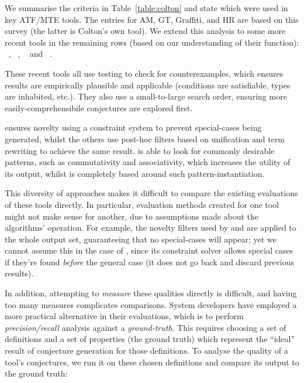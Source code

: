 

We summarise the criteria in Table~\ref{table:colton} and state which were used
in key ATF/MTE tools. The entries for AM, GT, Graffiti, \Bagai{} and HR are
based on this survey (the latter is Colton's own tool). We extend this analysis
to some more recent tools in the remaining rows (based on our understanding of
their function): \quickspec{}~\cite{QuickSpec},
\speculate{}~\cite{braquehais2017speculate},
\isacosy{}~\cite{Johansson.Dixon.Bundy:conjecture-generation}
and \isascheme{}~\cite{MontanoRivas2011}.

These recent tools all use testing to check for counterexamples, which ensures
results are empirically plausible and applicable (conditions are satisfiable,
types are inhabited, etc.). They also use a small-to-large search order,
ensuring more easily-comprehensibile conjectures are explored first.

\isacosy{} ensures novelty using a constraint system to prevent special-cases
being generated, whilst the others use post-hoc filters based on unification and
term rewriting to achieve the same result. \isacosy{} is able to look for
commonly desirable patterns, such as commutativity and associativity, which
increases the utility of its output, whilst \isascheme{} is completely based
around such pattern-instantiation.

This diversity of approaches makes it difficult to compare the existing
evaluations of these tools directly. In particular, evaluation methods created
for one tool might not make sense for another, due to assumptions made about
the algorithms' operation. For example, the novelty filters used by \quickspec{}
and \speculate{} are applied to the whole output set, guaranteeing that no
special-cases will appear; yet we cannot assume this in the case of \isacosy{},
since its constraint solver allows special cases if they're found \emph{before}
the general case (it does not go back and discard previous results).

In addition, attempting to \emph{measure} these qualities directly is difficult,
and having too many measures complicates comparisons. System developers have
employed a more practical alternative in their evaluations, which is to perform
\emph{precision/recall} analysis against a \emph{ground-truth}. This requires
choosing a set of definitions and a set of properties (the ground truth) which
represent the ``ideal'' result of conjecture generation for those definitions.
To analyse the quality of a tool's conjectures, we run it on these chosen
definitions and compare its output to the ground truth:

